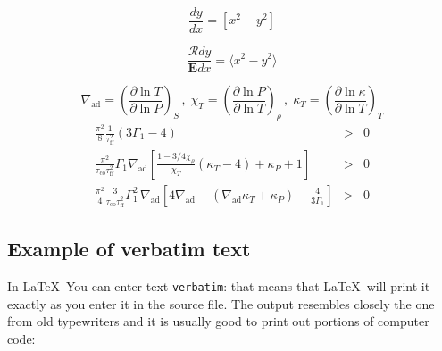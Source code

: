 \documentclass[a4paper,10pt]{article}
\begin{document}
\begin{equation}
 \displaystyle \frac{dy}{dx} = [ x^2 - y^2 ]
\end{equation}

\begin{equation}
 \displaystyle \frac{\mathcal R dy}{\mathbf E dx} = \langle x^2 - y^2 \rangle
\end{equation}

   \begin{displaymath}
      \nabla_{\mathrm{ad}} = \left( \frac{ \partial \ln T}
                             { \partial\ln P} \right)_{S} \, , \;
      \chi^{}_T       = \left( \frac{ \partial \ln P}
                             { \partial\ln T} \right)_{\rho} \, , \;
      \kappa^{}_{T}   = \left( \frac{ \partial \ln \kappa}
                             { \partial\ln T} \right)_{T}
   \end{displaymath} 
   \begin{eqnarray}
      \frac{\pi^2}{8} \frac{1}{\tau_{\mathrm{ff}}^2}
                ( 3 \Gamma_1 - 4 )
         & > & 0 \label{ZSDynSta} \\
      \frac{\pi^2}{\tau_{\mathrm{co}}
                   \tau_{\mathrm{ff}}^2}
                   \Gamma_1 \nabla_{\mathrm{ad}}
                   \left[ \frac{ 1- 3/4 \chi^{}_\rho }{ \chi^{}_T }
                          ( \kappa^{}_T - 4 )
                        + \kappa^{}_P + 1
                   \right]
        & > & 0 \label{ZSSecSta} \\
     \frac{\pi^2}{4} \frac{3}{\tau_{ \mathrm{co} }
                              \tau_{ \mathrm{ff} }^2
                             }
         \Gamma_1^2 \, \nabla_{\mathrm{ad}} \left[
                                   4 \nabla_{\mathrm{ad}}
                                   - ( \nabla_{\mathrm{ad}} \kappa^{}_T
                                     + \kappa^{}_P
                                     )
                                   - \frac{4}{3 \Gamma_1}
                                \right]
        & > & 0   \label{ZSVibSta}
   \end{eqnarray}

\subsection{Example of verbatim text}
In \LaTeX\, You can enter text \texttt{verbatim}: that means that 
\LaTeX\, will print it exactly as you enter it in the source file. The
output resembles closely the one from old typewriters and it
is usually good to print out portions of computer code:
\end{document}
